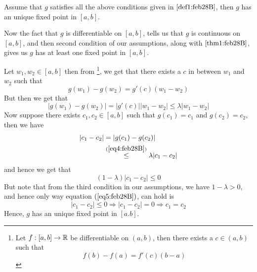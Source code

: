 \begin{thm}\label{thm2:feb28B}
    Assume that $g$ satisfies all the above conditions given in  $\ref{def1:feb28B}$, then $g$ has an unique fixed point in $[a,b]$.
\end{thm}
\begin{prf}
    Now the fact that $g$ is differentiable on $[a,b]$, tells us that $g$ is continuous on $[a,b]$, and then second condition of our assumptions, along with  $\ref{thm1:feb28B}$, gives us $g$ has at least one fixed point in $[a,b]$.     

    Let $w_1, w_2 \in [a,b]$ then from \footnote[1]{ Let $f : [a,b] \to \mathbb{R}$ be differentiable on $(a,b)$, then there exists a $c \in (a,b)$ such that \[ f(b)-f(a) = f'(c) (b-a) \] }, we get that there exists a $c$ in between $w_1$ and $w_2$ such that 
    \[
        g(w_1) - g(w_2) = g'(c) (w_1 - w_2)     
    \]
    But then we get that 
    \begin{equation}\label{eq4:feb28B}
        |g(w_1) - g(w_2)| = |g'(c)| |w_1 - w_2| \leq \lambda |w_1 - w_2|
    \end{equation}
    Now suppose there exists $c_1, c_2 \in [a,b]$ such that $g(c_1) = c_1$ and $g(c_2) = c_2$, then we have 
    \begin{align*}
        |c_1 - c_2| &= |g(c_1) - g(c_2)| \\ 
                    &\overset{(\ref{eq4:feb28B})}{\leq} \lambda |c_1 - c_2|
    \end{align*}
    and hence we get that
    \begin{equation}\label{eq5:feb28B}
        (1-\lambda)|c_1 - c_2| \leq 0        
    \end{equation} 
    But note that from the third condition in our assumptions, we have $1 -\lambda > 0$, and hence only way equation $(\ref{eq5:feb28B})$, can hold is 
    \[
        |c_1 - c_2| \leq 0 \Rightarrow |c_1 - c_2| = 0 \Rightarrow c_1 = c_2  
    \]
    Hence, $g$ has an unique fixed point in $[a.b]$.
\end{prf}